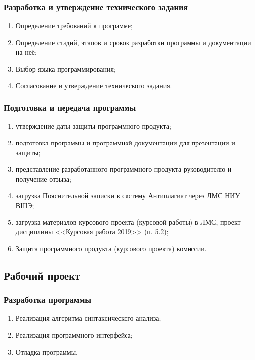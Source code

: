 \documentclass[a4paper,12pt,reqno]{article}
\begin{document}
      \subsubsection*{Разработка и утверждение технического задания}
      \begin{enumerate}
        \item Определение требований к программе;
        \item Определение стадий, этапов и сроков разработки программы и документации на неё;
        \item Выбор языка программирования;
        \item Согласование и утверждение технического задания.
      \end{enumerate}
      \subsubsection*{Подготовка и передача программы}
      \begin{enumerate}
        \item утверждение даты защиты программного продукта;
        \item подготовка программы и программной документации для презентации и защиты;
        \item представление разработанного программного продукта руководителю и получение отзыва;
        \item загрузка Пояснительной записки в систему Антиплагиат через ЛМС НИУ ВШЭ;
        \item загрузка материалов курсового проекта (курсовой работы) в ЛМС, проект дисциплины <<Курсовая работа 2019>> (п. 5.2);
        \item Защита программного продукта (курсового проекта) комиссии.
      \end{enumerate}
    \subsection{Рабочий проект}
      \subsubsection*{Разработка программы}
      \begin{enumerate}
        \item Реализация алгоритма синтаксического анализа;
        \item Реализация программного интерфейса;
        \item Отладка программы.
      \end{enumerate}
\end{document}
